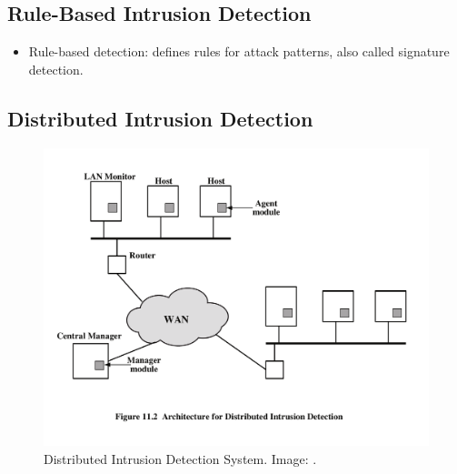 \subsection{Rule-Based Intrusion Detection}

\begin{frame}
  \begin{itemize}
    \item Rule-based detection: defines rules for attack patterns, also called 
      signature detection.
  \end{itemize}
\end{frame}

%

\subsection{Distributed Intrusion Detection}

\begin{frame}
  \begin{figure}
    \includegraphics[height=0.7\textheight]{dids.pdf}
    \caption{Distributed Intrusion Detection System.
      Image: \cite{Stallings2013nse}.}
  \end{figure}
\end{frame}


